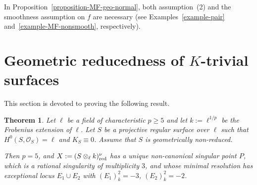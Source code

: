 \documentclass[reqno,oneside]{amsart}
\newtheorem{theorem}{Theorem}[section]
\theoremstyle{definition}
\theoremstyle{plain}
\numberwithin{equation}{section}
\begin{document}
In Proposition~\ref{proposition-MF-geo-normal}, both assumption~\textup{(2)} and the smoothness assumption on $f$ are necessary (see Examples~\ref{example-pair} and~\ref{example-MF-nonsmooth}, respectively).

\section{Geometric reducedness of $K$-trivial surfaces}\label{section-proof}
This section is devoted to proving the following result.
\begin{theorem}\label{theorem-geo-int-K-trivial}
  Let $\ell$ be a field of characteristic $p\ge 5$ and let $k:=\ell^{1/p}$ be the Frobenius extension of $\ell$.
  Let $S$ be a projective regular surface over $\ell$ such that $H^0(S,\mathcal{O}_S)=\ell$ and $K_S \equiv 0$.
  Assume that $S$ is geometrically non-reduced.

  Then $p = 5$, and $X:=(S\otimes_{\ell} k)_{\rm red}^{\nu}$ has a unique non-canonical singular point $P$,
  which is a rational singularity of multiplicity $3$, and whose minimal resolution has exceptional locus $E_1 \cup E_2$ with $(E_1)^2_{k} = -3$, $(E_2)^2_{k} = -2$.
\end{theorem}
\end{document}

